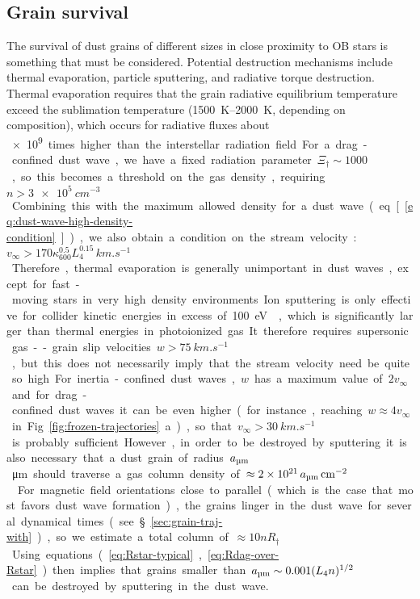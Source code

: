 \subsection{Grain survival}
\label{sec:grain-survival-dust}

The survival of dust grains of different sizes in close proximity to
OB stars is something that must be considered.  Potential destruction
mechanisms include thermal evaporation, particle sputtering, and
radiative torque destruction.  Thermal evaporation requires that the
grain radiative equilibrium temperature exceed the sublimation
temperature (\SIrange{1500}{2000}{K}, depending on composition), which
occurs for radiative fluxes about \SI{e9} times higher than the
interstellar radiation field.  For a drag-confined dust wave, we have
a fixed radiation parameter \(\Xi_\dag \sim 1000\), so this becomes a
threshold on the gas density, requiring \(n > \SI{3e5}{cm^{-3}}\).
Combining this with the maximum allowed density for a dust wave
(eq.~[\ref{eq:dust-wave-high-density-condition}]), we also obtain a
condition on the stream velocity:
\(v_\infty > 170 \kappa_{600}^{0.5} L_4^{0.15} \, \si{km.s^{-1}}\).  Therefore,
thermal evaporation is generally unimportant in dust waves, except for
fast-moving stars in very high density environments.

Ion sputtering is only effective for collider kinetic energies in
excess of \SI{100}{eV} \citep{Draine:1995a, Field:1997a}, which is
significantly larger than thermal energies in photoionized gas.  It
therefore requires supersonic gas--grain slip velocities
\(w > \SI{75}{km.s^{-1}}\), but this does not necessarily imply that
the stream velocity need be quite so high.  For inertia-confined dust
waves, \(w\) has a maximum value of \(2 v_\infty\) and for drag-confined
dust waves it can be even higher (for instance, reaching
\(w \approx 4 v_\infty\) in Fig.~\ref{fig:frozen-trajectories}a), so that
\(v_\infty > \SI{30}{km.s^{-1}}\) is probably sufficient.  However, in
order to be destroyed by sputtering it is also necessary that a dust
grain of radius \(\amu\)\,\si{\um} should traverse a gas column
density of \(\approx \num{2e21}\, \amu \,\si{cm^{-2}}\)
\citep{Draine:2011a}.  For magnetic field orientations close to
parallel (which is the case that most favors dust wave formation), the
grains linger in the dust wave for several dynamical times (see
\S~\ref{sec:grain-traj-with}), so we estimate a total column of
\(\approx 10 n R_\dag\).  Using equations~(\ref{eq:Rstar-typical},
\ref{eq:Rdag-over-Rstar}) then implies that grains smaller than
\(\amu \sim 0.001 (L_4 n)^{1/2}\) can be destroyed by sputtering in the
dust wave.

